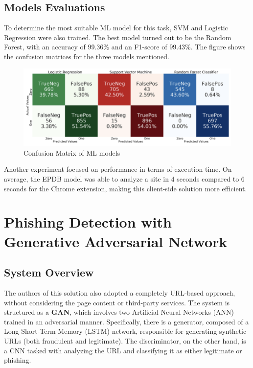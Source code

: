 \subsection{Models Evaluations}
To determine the most suitable ML model for this task, SVM and Logistic Regression were also trained. The best model turned out to be the Random Forest, with an accuracy of 99.36\% and an F1-score of 99.43\%. The figure shows the confusion matrices for the three models mentioned.

\begin{figure}[htp]
    \centering
    \includegraphics[width=1\linewidth]{images/ML_comparison.png}
    \caption{Confusion Matrix of ML models}
    \label{fig:Confusion Matrix of ML models}
\end{figure}

Another experiment focused on performance in terms of execution time. On average, the EPDB model was able to analyze a site in 4 seconds compared to 6 seconds for the Chrome extension, making this client-side solution more efficient.

\section{Phishing Detection with Generative Adversarial Network}

\subsection{System Overview}
The authors of this solution also adopted a completely URL-based approach, without considering the page content or third-party services. The system is structured as a \textbf{GAN}, which involves two Artificial Neural Networks (ANN) trained in an adversarial manner. Specifically, there is a generator, composed of a Long Short-Term Memory (LSTM) network, responsible for generating synthetic URLs (both fraudulent and legitimate). The discriminator, on the other hand, is a CNN tasked with analyzing the URL and classifying it as either legitimate or phishing.

